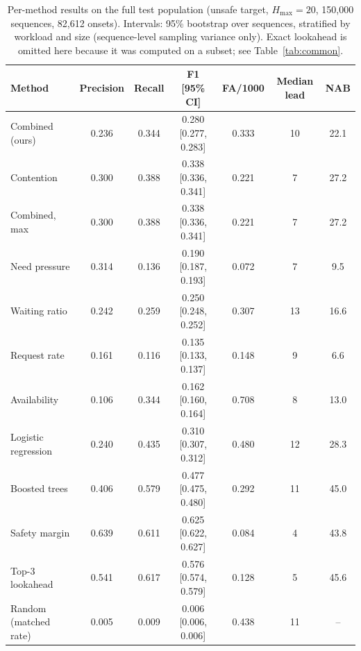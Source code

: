 \documentclass[conference]{IEEEtran}
\begin{document}
\begin{table}[t]
\centering\footnotesize
\caption{Per-method results on the full test population (unsafe target, $H_{\max}=20$, 150,000 sequences, 82,612 onsets). Intervals: 95\% bootstrap over sequences, stratified by workload and size (sequence-level sampling variance only). Exact lookahead is omitted here because it was computed on a subset; see Table~\ref{tab:common}.}
\label{tab:main}
\begin{tabular}{lcccccc}
\toprule
Method & Precision & Recall & F1 [95\% CI] & FA/1000 & Median lead & NAB \\
\midrule
Combined (ours) & 0.236 & 0.344 & 0.280 [0.277, 0.283] & 0.333 & 10 & 22.1 \\
Contention & 0.300 & 0.388 & 0.338 [0.336, 0.341] & 0.221 & 7 & 27.2 \\
Combined, max & 0.300 & 0.388 & 0.338 [0.336, 0.341] & 0.221 & 7 & 27.2 \\
Need pressure & 0.314 & 0.136 & 0.190 [0.187, 0.193] & 0.072 & 7 & 9.5 \\
Waiting ratio & 0.242 & 0.259 & 0.250 [0.248, 0.252] & 0.307 & 13 & 16.6 \\
Request rate & 0.161 & 0.116 & 0.135 [0.133, 0.137] & 0.148 & 9 & 6.6 \\
Availability & 0.106 & 0.344 & 0.162 [0.160, 0.164] & 0.708 & 8 & 13.0 \\
Logistic regression & 0.240 & 0.435 & 0.310 [0.307, 0.312] & 0.480 & 12 & 28.3 \\
Boosted trees & 0.406 & 0.579 & 0.477 [0.475, 0.480] & 0.292 & 11 & 45.0 \\
Safety margin & 0.639 & 0.611 & 0.625 [0.622, 0.627] & 0.084 & 4 & 43.8 \\
Top-3 lookahead & 0.541 & 0.617 & 0.576 [0.574, 0.579] & 0.128 & 5 & 45.6 \\
Random (matched rate) & 0.005 & 0.009 & 0.006 [0.006, 0.006] & 0.438 & 11 & -- \\
\bottomrule
\end{tabular}
\end{table}
\end{document}

